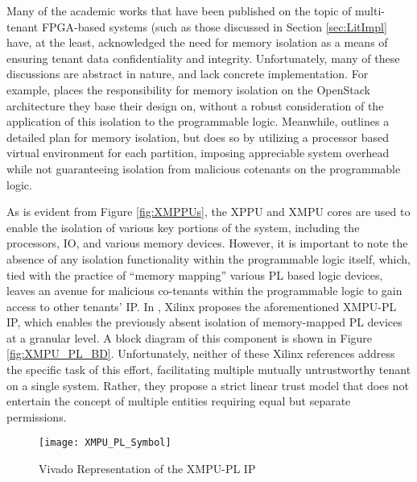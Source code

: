 Many of the academic works that have been published on the topic of multi-tenant FPGA-based systems (such as those discussed in Section \ref{sec:LitImpl} have, at the least, acknowledged the need for memory isolation as a means of ensuring tenant data confidentiality and integrity. Unfortunately, many of these discussions are abstract in nature, and lack concrete implementation. For example, \cite{bag_cryptographically_2020} places the responsibility for memory isolation on the OpenStack architecture they base their design on, without a robust consideration of the application of this isolation to the programmable logic. Meanwhile, \cite{chen_enabling_2014} outlines a detailed plan for memory isolation, but does so by utilizing a processor based virtual environment for each partition, imposing appreciable system overhead while not guaranteeing isolation from malicious cotenants on the programmable logic.

As is evident from Figure \ref{fig:XMPPUs}, the XPPU and XMPU cores are used to enable the isolation of various key portions of the system, including the processors, IO, and various memory devices. However, it is important to note the absence of any isolation functionality within the programmable logic itself, which, tied with the practice of ``memory mapping'' various PL based logic devices, leaves an avenue for malicious co-tenants within the programmable logic to gain access to other tenants' IP. In \cite{noauthor_memory_2021}, Xilinx proposes the aforementioned XMPU-PL IP, which enables the previously absent isolation of memory-mapped PL devices at a granular level. A block diagram of this component is shown in Figure \ref{fig:XMPU_PL_BD}. Unfortunately, neither of these Xilinx references address the specific task of this effort, facilitating multiple mutually untrustworthy tenant on a single system. Rather, they propose a strict linear trust model that does not entertain the concept of multiple entities requiring equal but separate permissions.

\begin{figure}[h]
    \centering
    \texttt{[image: XMPU\_PL\_Symbol]}
    \caption [XMPU-PL IP Core]{Vivado Representation of the XMPU-PL IP \cite{noauthor_memory_2021}}
    \label{fig:XMPU_PL_Sym}
\end{figure}



